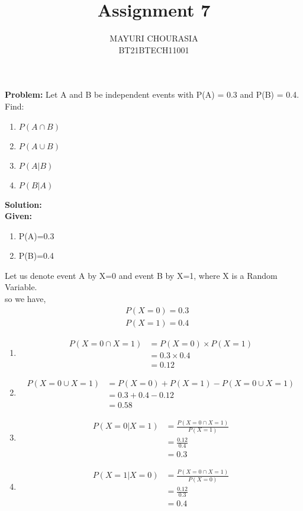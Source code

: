 \documentclass[journal,12pt,twocolumn]{IEEEtran}
\title{Assignment 7}
\author{MAYURI CHOURASIA\\BT21BTECH11001}
\date{}
\newcommand{\PROBLEM}{\noindent \textbf{Problem: }}
\newcommand{\solution}{\noindent \textbf{Solution: }}
\newcommand{\given}{\noindent \textbf{Given: }}
\begin{document}
\maketitle
\PROBLEM Let A and B be independent events with P(A) = 0.3 and P(B) = 0.4. Find:\\
\begin{enumerate}
    \item $P(A \cap B)$
    \item $P(A \cup B)$
    \item $P(A|B)$
    \item $P(B|A)$
\end{enumerate}
\solution \\
\given \begin{enumerate} 
    \item P(A)=0.3
    \item P(B)=0.4
\end{enumerate}
Let us denote event A by X=0 and event B by X=1, where X is a Random Variable.\\
so we have,\\
\begin{align}
    &P(X=0)=0.3\\
    &P(X=1)=0.4
\end{align}
\begin{enumerate}
\item \begin{align}
    P(X=0 \cap X=1) &= P(X=0)\times P(X=1)\\
    &= 0.3 \times 0.4\\
    &= 0.12
\end{align}

\item \begin{align}
P(X=0 \cup X=1) &= P(X=0) + P(X=1) - P(X=0 \cup X=1)\\
&= 0.3 + 0.4 - 0.12\\
&=0.58
\end{align}
\item \begin{align}
    P(X=0 | X=1) &= \frac{P(X=0 \cap X=1)}{P(X=1)}\\
&= \frac{0.12}{0.4}\\
&=0.3
\end{align}
\item \begin{align}
    P(X=1 | X=0) &= \frac{P(X=0 \cap X=1)}{P(X=0)}\\
&= \frac{0.12}{0.3}\\
&=0.4
\end{align}
\end{enumerate}
\end{document}
